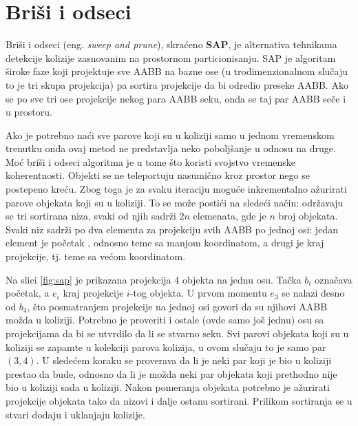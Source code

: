 \documentclass[12pt,oneside]{memoir}
\begin{document}
\section{Briši i odseci}
\label{subsec:sap}

Briši i odseci (eng. {\em sweep and prune}), skraćeno \textbf{SAP}, je alternativa tehnikama detekcije kolizije 
zasnovanim na prostornom particionisanju.
SAP je algoritam široke faze koji projektuje sve AABB
na bazne ose (u trodimenzionalnom slučaju to je tri skupa projekcija) pa sortira projekcije da bi odredio preseke AABB.
Ako se po sve tri ose projekcije nekog para AABB seku, onda se taj par AABB seče i u prostoru.

Ako je potrebno naći sve parove koji su u koliziji samo u jednom vremenskom trenutku onda ovaj metod ne predstavlja neko poboljšanje u odnosu na druge.
Moć briši i odseci algoritma je u tome što koristi svojstvo vremenske koherentnosti.
Objekti se ne teleportuju nasumično kroz prostor nego se postepeno kreću. 
Zbog toga je za svaku iteraciju moguće inkrementalno ažurirati parove objekata koji su u koliziji.
To se može postići na sledeći način: održavaju se tri sortirana niza, svaki od njih sadrži $2n$ elemenata, gde je $n$ broj objekata.
Svaki niz sadrži po dva elementa za projekciju svih AABB po jednoj osi: jedan element je početak 
, odnosno teme sa manjom koordinatom, a drugi je kraj projekcije, tj. teme sa većom koordinatom. 

Na slici \ref{fig:sap} je prikazana projekcija 4 objekta na jednu osu. 
Tačka $b_i$ označava početak, a $e_i$ kraj projekcije $i$-tog objekta.
U prvom momentu $e_3$ se nalazi desno od $b_4$, što posmatranjem projekcije na jednoj osi govori da su njihovi AABB možda u koliziji.
Potrebno je proveriti i ostale (ovde samo još jednu) osu sa projekcijama da bi se utvrdilo da li se stvarno seku.
Svi parovi objekata koji su u koliziji se zapamte u kolekciji parova kolizija, u ovom slučaju to je samo par $(3, 4)$.
U sledećem koraku se proverava da li je neki par koji je bio u koliziji prestao da bude, 
odnosno da li je možda neki par objekata koji prethodno nije bio u koliziji sada u koliziji.
Nakon pomeranja objekata potrebno je ažurirati projekcije objekata tako da nizovi i dalje ostanu sortirani.
Prilikom sortiranja se u stvari dodaju i uklanjaju kolizije.
\end{document}
